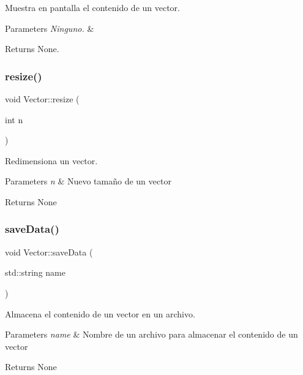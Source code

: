 Muestra en pantalla el contenido de un vector. 


\begin{DoxyParams}{Parameters}
{\em Ninguno.} & \\
\hline
\end{DoxyParams}
\begin{DoxyReturn}{Returns}
None. 
\end{DoxyReturn}
\hypertarget{class_vector_a175af2263b569cd6c2b8d3286c02f3a4}{}\label{class_vector_a175af2263b569cd6c2b8d3286c02f3a4} 
\subsubsection{\texorpdfstring{resize()}{resize()}}
{\footnotesize\ttfamily void Vector\+::resize (\begin{DoxyParamCaption}\item[{int}]{n }\end{DoxyParamCaption})}



Redimensiona un vector. 


\begin{DoxyParams}{Parameters}
{\em n} & Nuevo tamaño de un vector \\
\hline
\end{DoxyParams}
\begin{DoxyReturn}{Returns}
None 
\end{DoxyReturn}
\hypertarget{class_vector_a5800036c27dc546cd7db4365d8ce206a}{}\label{class_vector_a5800036c27dc546cd7db4365d8ce206a} 
\subsubsection{\texorpdfstring{save\+Data()}{saveData()}}
{\footnotesize\ttfamily void Vector\+::save\+Data (\begin{DoxyParamCaption}\item[{std\+::string}]{name }\end{DoxyParamCaption})}



Almacena el contenido de un vector en un archivo. 


\begin{DoxyParams}{Parameters}
{\em name} & Nombre de un archivo para almacenar el contenido de un vector \\
\hline
\end{DoxyParams}
\begin{DoxyReturn}{Returns}
None 
\end{DoxyReturn}
\hypertarget{class_vector_a93f0b87707399eaa672d93e54c033f7a}{}\label{class_vector_a93f0b87707399eaa672d93e54c033f7a} 
